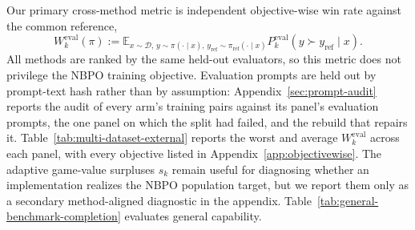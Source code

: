 \documentclass{article}
\theoremstyle{remark}
\theoremstyle{plain}
\newcommand{\E}{\mathbb{E}}
\newcommand{\D}{\mathcal{D}}
\newcommand{\piref}{\pi_{\mathrm{ref}}}
\begin{document}
Our primary cross-method metric is independent objective-wise win rate against the common reference,
\begin{equation}
W_k^{\mathrm{eval}}(\pi)
:=
\E_{x\sim\D,\,y\sim\pi(\cdot\mid x),\,y_{\mathrm{ref}}\sim\piref(\cdot\mid x)}
P_k^{\mathrm{eval}}(y\succ y_{\mathrm{ref}}\mid x).
\label{eq:external-win-rate}
\end{equation}
All methods are ranked by the same held-out evaluators, so this metric does not privilege the NBPO training objective. Evaluation prompts are held out by prompt-text hash rather than by assumption: Appendix~\ref{sec:prompt-audit} reports the audit of every arm's training pairs against its panel's evaluation prompts, the one panel on which the split had failed, and the rebuild that repairs it. Table~\ref{tab:multi-dataset-external} reports the worst and average $W_k^{\mathrm{eval}}$ across each panel, with every objective listed in Appendix~\ref{app:objectivewise}. The adaptive game-value surpluses $s_k$ remain useful for diagnosing whether an implementation realizes the NBPO population target, but we report them only as a secondary method-aligned diagnostic in the appendix. Table~\ref{tab:general-benchmark-completion} evaluates general capability.
\end{document}
